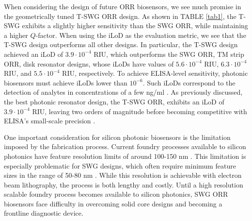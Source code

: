 \documentclass[aps,prl,twocolumn, superscriptaddress,nobalancelastpage]{revtex4}
\begin{document}
When considering the design of future ORR biosensors, we see much promise in the geometrically tuned T-SWG ORR design. As shown in TABLE \ref{tab1}, the T-SWG exhibits a slightly higher sensitivity than the SWG ORR, while maintaining a higher $Q$-factor. When using the iLoD as the evaluation metric, we see that the T-SWG design outperforms all other designs. In particular, the T-SWG design \cite{TSWGbio} achieved an iLoD of $3.9\cdot 10^{-4}$ RIU, which outperforms the SWG ORR, TM strip ORR, disk resonator designs, whose iLoDs have values of $5.6 \cdot 10^{-4}$ RIU, $6.3\cdot 10^{-4}$ RIU, and $5.5 \cdot 10^{-4}$ RIU, respectively. To achieve ELISA-level sensitivity, photonic biosensors must achieve iLoDs lower than $10^{-6}$. Such iLoDs correspond to the detection of analytes in concentrations of a few ng/ml \cite{LoDPhotonicBiosensors}. As previously discussed, the best photonic resonator design, the T-SWG ORR, exhibits an iLoD of $3.9 \cdot 10^{-4}$ RIU, leaving two orders of magnitude before becoming competitive with ELISA's small-scale precision \cite{ELISAlimit}.



One important consideration for silicon photonic biosensors is the limitation imposed by the fabrication process. Current foundry processes available to silicon photonics have feature resolution limits of around 100-150 nm \cite{cmos}. This limitation is especially problematic for SWG designs, which often require minimum feature sizes in the range of 50-80 nm \cite{swg1}. While this resolution is achievable with electron beam lithography, the process is both lengthy and costly. Until a high resolution scalable foundry process becomes available to silicon photonics, SWG ORR biosensors face difficulty in overcoming solid core designs and becoming a frontline diagnostic device. 
\end{document}
